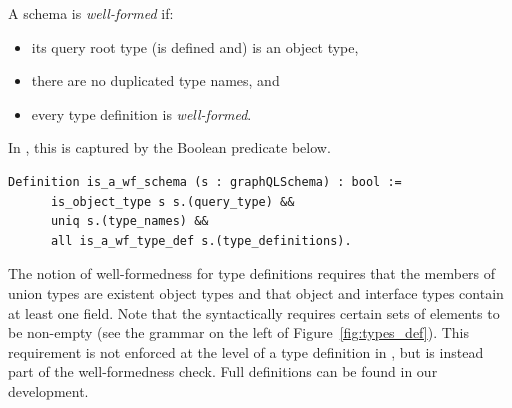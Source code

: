 \begin{definition}
A \gql schema is \textit{well-formed} if: 
\begin{itemize}
    \item its query root type (is defined and) is an object type, 
    \item there are no duplicated type names, and
    \item every type definition is \textit{well-formed}.
\end{itemize}
\end{definition}

In \gcoql, this is captured by the Boolean predicate below. %
%
\begin{verbatim}
Definition is_a_wf_schema (s : graphQLSchema) : bool :=
      is_object_type s s.(query_type) &&
      uniq s.(type_names) &&
      all is_a_wf_type_def s.(type_definitions).
\end{verbatim}
%
The notion of well-formedness for type definitions requires \eg that
the members of union types are existent object types and that object and
interface types contain at least one field. %
Note that the \spec syntactically requires certain sets of elements to be non-empty (see the grammar on the left of
Figure~\ref{fig:types_def}). This requirement is not enforced at the level of a type definition in \gcoql, but is instead part of the well-formedness check.
Full definitions can be found in our
\coq development. %



